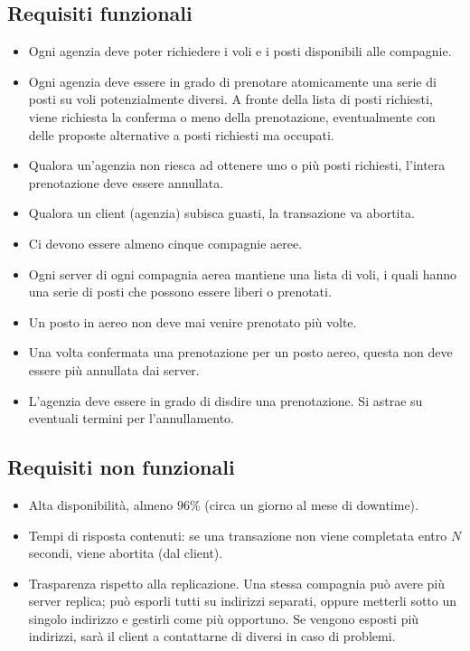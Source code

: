 \documentclass[a4paper]{article}
\begin{document}
\subsection{Requisiti funzionali}
\begin{itemize}
	\item Ogni agenzia deve poter richiedere i voli e i posti disponibili alle compagnie.
	\item Ogni agenzia deve essere in grado di prenotare atomicamente una serie di posti su voli potenzialmente diversi. A fronte della lista di posti richiesti, viene richiesta la conferma o meno della prenotazione, eventualmente con delle proposte alternative a posti richiesti ma occupati.
	\item Qualora un'agenzia non riesca ad ottenere uno o più posti richiesti, l'intera prenotazione deve essere annullata.
	\item Qualora un client (agenzia) subisca guasti, la transazione va abortita.
	\item Ci devono essere almeno cinque compagnie aeree.
	\item Ogni server di ogni compagnia aerea mantiene una lista di voli, i quali hanno una serie di posti che possono essere liberi o prenotati.
	\item Un posto in aereo non deve mai venire prenotato più volte.
	\item Una volta confermata una prenotazione per un posto aereo, questa non deve essere più annullata dai server.
	\item L'agenzia deve essere in grado di disdire una prenotazione. Si astrae su eventuali termini per l'annullamento.
\end{itemize}

\subsection{Requisiti non funzionali}

\begin{itemize}
	\item Alta disponibilità, almeno $96\%$ (circa un giorno al mese di downtime).
	\item Tempi di risposta contenuti: se una transazione non viene completata entro $N$ secondi, viene abortita (dal client).
		\item Trasparenza rispetto alla replicazione. Una stessa compagnia può avere più server replica; può esporli tutti su indirizzi separati, oppure metterli sotto un singolo indirizzo e gestirli come più opportuno. Se vengono esposti più indirizzi, sarà il client a contattarne di diversi in caso di problemi.
\end{itemize}
\end{document}
